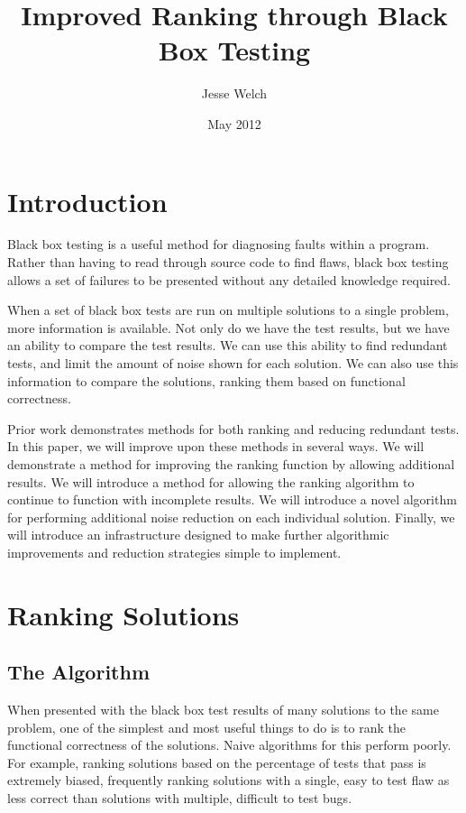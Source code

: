 \documentclass[11pt,twoside]{article}
\title{Improved Ranking through Black Box Testing}
\author{Jesse Welch}
\date{May 2012}
\begin{document}
\baselineskip %

\maketitle

\tableofcontents
\newpage

\section{Introduction}
Black box testing is a useful method for diagnosing faults within a program. Rather than having to read through source code to find flaws, black box testing allows a set of failures to be presented without any detailed knowledge required.

When a set of black box tests are run on multiple solutions to a single problem, more information is available. Not only do we have the test results, but we have an ability to compare the test results. We can use this ability to find redundant tests, and limit the amount of noise shown for each solution. We can also use this information to compare the solutions, ranking them based on functional correctness.

Prior work demonstrates methods for both ranking and reducing redundant tests. In this paper, we will improve upon these methods in several ways. We will demonstrate a method for improving the ranking function by allowing additional results. We will introduce a method for allowing the ranking algorithm to continue to function with incomplete results. We will introduce a novel algorithm for performing additional noise reduction on each individual solution. Finally, we will introduce an infrastructure designed to make further algorithmic improvements and reduction strategies simple to implement.

\section{Ranking Solutions}
\subsection{The Algorithm}
When presented with the black box test results of many solutions to the same problem, one of the simplest and most useful things to do is to rank the functional correctness of the solutions. Naive algorithms for this perform poorly. For example, ranking solutions based on the percentage of tests that pass is extremely biased, frequently ranking solutions with a single, easy to test flaw as less correct than solutions with multiple, difficult to test bugs.
\end{document}
